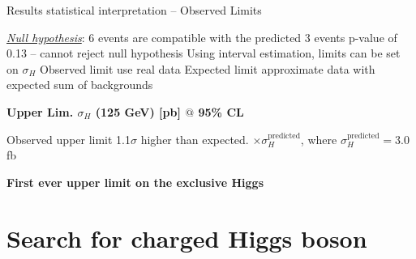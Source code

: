 \documentclass[10pt]{beamer}
\begin{document}
\begin{frame}{Results statistical interpretation -- Observed Limits}
\begin{outline}
\1 {\it \uline{Null hypothesis}}: 6 events are compatible with the predicted 3 events
	\2 p-value of 0.13 -- cannot reject null hypothesis
\1 Using interval estimation, limits can be set on $\sigma_H$
	\1 Observed limit use real data
	\1 Expected limit approximate data with expected sum of backgrounds 
\end{outline}

\begin{center}
{\bf\color{blue} Upper Lim. $\sigma_H$ (125 GeV) [pb] $@$ 95\% CL }
\end{center}

\begin{outline}
\1 Observed upper limit 1.1$\sigma$ higher than expected.
$\times\sigma_H^{\textrm{predicted}}$, where $\sigma_H^{\textrm{predicted}}=3.0$ fb 
\end{outline}
\centering
{\bf First ever upper limit on the exclusive Higgs}

\end{frame}

\section{Search for charged Higgs boson}
\end{document}
